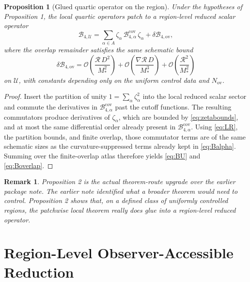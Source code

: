 \documentclass[11pt]{article}
\newtheorem{proposition}{Proposition}
\newtheorem{remark}{Remark}
\begin{document}
\begin{proposition}[Glued quartic operator on the region]
Under the hypotheses of Proposition 1, the local quartic operators patch to a region-level reduced scalar operator
\begin{equation}
\mathcal B_{4,\mathcal U}
=
\sum_{\alpha\in A}\zeta_\alpha\,\mathcal B_{4,\alpha}^{\mathrm{cov}}\,\zeta_\alpha
+ \delta\mathcal B_{4,\mathrm{ov}},
\label{eq:BU}
\end{equation}
where the overlap remainder satisfies the same schematic bound
\begin{equation}
\delta\mathcal B_{4,\mathrm{ov}}
=
\mathcal O\!\left(\frac{\mathcal R\,D^2}{M_*^2}\right)
+ \mathcal O\!\left(\frac{\nabla\mathcal R\,D}{M_*^3}\right)
+ \mathcal O\!\left(\frac{\mathcal R^2}{M_*^2}\right)
\label{eq:Boverlap}
\end{equation}
on \(\mathcal U\), with constants depending only on the uniform control data and \(N_{\mathrm{ov}}\).
\end{proposition}

\begin{proof}
Insert the partition of unity \(1=\sum_\alpha \zeta_\alpha^2\) into the local reduced scalar sector and commute the derivatives in \(\mathcal B_{4,\alpha}^{\mathrm{cov}}\) past the cutoff functions. The resulting commutators produce derivatives of \(\zeta_\alpha\), which are bounded by \eqref{eq:zetabounds}, and at most the same differential order already present in \(\mathcal B_{4,\alpha}^{\mathrm{cov}}\). Using \eqref{eq:LR}, the partition bounds, and finite overlap, those commutator terms are of the same schematic sizes as the curvature-suppressed terms already kept in \eqref{eq:Balpha}. Summing over the finite-overlap atlas therefore yields \eqref{eq:BU} and \eqref{eq:Boverlap}.
\end{proof}

\begin{remark}
Proposition 2 is the actual theorem-route upgrade over the earlier package note. The earlier note identified what a broader theorem would need to control. Proposition 2 shows that, on a defined class of uniformly controlled regions, the patchwise local theorem really does glue into a region-level reduced operator.
\end{remark}

\section{Region-Level Observer-Accessible Reduction}
\end{document}
